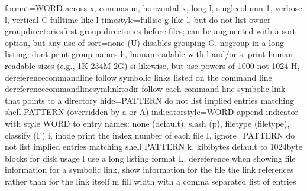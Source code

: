 \documentclass[letterpaper,12pt,english]{sphinxmanual}
\begin{document}
\begin{sphinxVerbatim}[commandchars=\\\{\}]
      \PYGZhy{}\PYGZhy{}format=WORD          across \PYGZhy{}x, commas \PYGZhy{}m, horizontal \PYGZhy{}x, long \PYGZhy{}l,
                               single\PYGZhy{}column \PYGZhy{}1, verbose \PYGZhy{}l, vertical \PYGZhy{}C
      \PYGZhy{}\PYGZhy{}full\PYGZhy{}time            like \PYGZhy{}l \PYGZhy{}\PYGZhy{}time\PYGZhy{}style=full\PYGZhy{}iso
  \PYGZhy{}g                         like \PYGZhy{}l, but do not list owner
      \PYGZhy{}\PYGZhy{}group\PYGZhy{}directories\PYGZhy{}first
                             group directories before files;
                               can be augmented with a \PYGZhy{}\PYGZhy{}sort option, but   any
                               use of \PYGZhy{}\PYGZhy{}sort=none (\PYGZhy{}U) disables grouping
  \PYGZhy{}G, \PYGZhy{}\PYGZhy{}no\PYGZhy{}group             in a long listing, don\PYGZsq{}t print group names
  \PYGZhy{}h, \PYGZhy{}\PYGZhy{}human\PYGZhy{}readable       with \PYGZhy{}l and/or \PYGZhy{}s, print human readable sizes
                               (e.g., 1K 234M 2G)
      \PYGZhy{}\PYGZhy{}si                   likewise, but use powers of 1000 not 1024
  \PYGZhy{}H, \PYGZhy{}\PYGZhy{}dereference\PYGZhy{}command\PYGZhy{}line
                             follow symbolic links listed on the command   line
      \PYGZhy{}\PYGZhy{}dereference\PYGZhy{}command\PYGZhy{}line\PYGZhy{}symlink\PYGZhy{}to\PYGZhy{}dir
                             follow each command line symbolic link
                               that points to a directory
      \PYGZhy{}\PYGZhy{}hide=PATTERN         do not list implied entries matching shell   PATTERN
                               (overridden by \PYGZhy{}a or \PYGZhy{}A)
      \PYGZhy{}\PYGZhy{}indicator\PYGZhy{}style=WORD  append indicator with style WORD to entry   names:
                               none (default), slash (\PYGZhy{}p),
                               file\PYGZhy{}type (\PYGZhy{}\PYGZhy{}file\PYGZhy{}type), classify (\PYGZhy{}F)
  \PYGZhy{}i, \PYGZhy{}\PYGZhy{}inode                print the index number of each file
  \PYGZhy{}I, \PYGZhy{}\PYGZhy{}ignore=PATTERN       do not list implied entries matching shell   PATTERN
  \PYGZhy{}k, \PYGZhy{}\PYGZhy{}kibibytes            default to 1024\PYGZhy{}byte blocks for disk usage
  \PYGZhy{}l                         use a long listing format
  \PYGZhy{}L, \PYGZhy{}\PYGZhy{}dereference          when showing file information for a symbolic
                               link, show information for the file the   link
                               references rather than for the link itself
  \PYGZhy{}m                         fill width with a comma separated list of   entries

\end{sphinxVerbatim}
\end{document}
